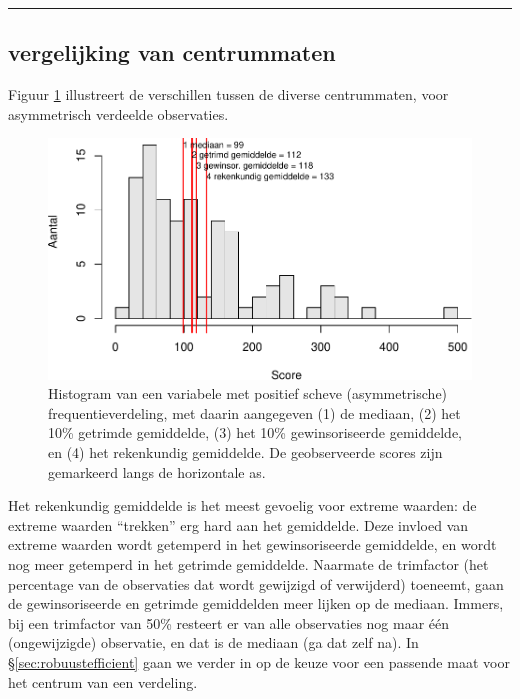 \documentclass[
]{book}
\begin{document}
\begin{center}\rule{0.5\linewidth}{0.5pt}\end{center}

\hypertarget{vergelijking-van-centrummaten}{%
\subsection{vergelijking van centrummaten}\label{vergelijking-van-centrummaten}}

Figuur \ref{fig:centrummaten} illustreert de verschillen tussen de
diverse centrummaten, voor asymmetrisch verdeelde observaties.

\begin{figure}
\centering
\includegraphics{KMS-NL_files/figure-latex/centrummaten-1.pdf}
\caption{\label{fig:centrummaten}Histogram van een variabele met positief scheve (asymmetrische) frequentieverdeling, met daarin aangegeven (1) de mediaan, (2) het 10\% getrimde gemiddelde, (3) het 10\% gewinsoriseerde gemiddelde, en (4) het rekenkundig gemiddelde. De geobserveerde scores zijn gemarkeerd langs de horizontale as.}
\end{figure}

Het rekenkundig gemiddelde is het meest gevoelig voor extreme waarden:
de extreme waarden ``trekken'' erg hard aan het gemiddelde. Deze invloed
van extreme waarden wordt getemperd in het gewinsoriseerde gemiddelde,
en wordt nog meer getemperd in het getrimde gemiddelde. Naarmate de
trimfactor (het percentage van de observaties dat wordt gewijzigd of
verwijderd) toeneemt, gaan de gewinsoriseerde en getrimde gemiddelden
meer lijken op de mediaan. Immers, bij een trimfactor van 50\% resteert
er van alle observaties nog maar één (ongewijzigde) observatie, en dat
is de mediaan (ga dat zelf na). In
§\ref{sec:robuustefficient} gaan we verder in op de keuze voor een
passende maat voor het centrum van een verdeling.
\end{document}
